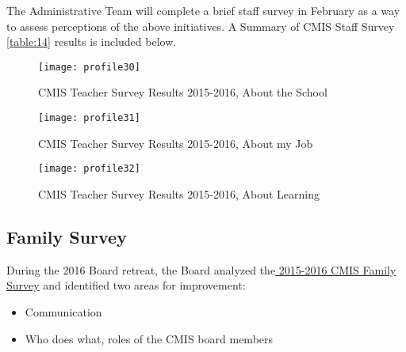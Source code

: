 The Administrative Team will complete a brief staff survey in February as a way to assess perceptions of the above initiatives.  A Summary of CMIS Staff Survey \ref{table:14} results is included below.   


\begin{figure}[H]
\centering
\caption{CMIS Teacher Survey Results 2015-2016, About the School}
\label{figure:teachersurveyschool}
\texttt{[image: profile30]}
\end{figure}

\begin{figure}[H]
\centering
\caption{CMIS Teacher Survey Results 2015-2016, About my Job}
\label{figure:teachersurveyjob}
\texttt{[image: profile31]}
\end{figure}

\begin{figure}[H]
\centering
\caption{CMIS Teacher Survey Results 2015-2016, About Learning}
\label{figure:teachersurveylearning}
\texttt{[image: profile32]}
\end{figure}

\subsection{Family Survey}

During the 2016 Board retreat, the Board analyzed the\href{https://docs.google.com/a/cmis.ac.th/forms/d/16Gbd3MzQOXtjjZ2dG460xw5SHG_eohMIKet3lxYUdAY/edit#responses}{ 2015-2016 CMIS Family Survey} and identified two areas for improvement:
\begin{itemize}
\item Communication
\item Who does what, roles of the CMIS board members
\end{itemize}



